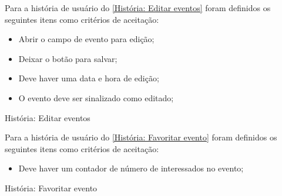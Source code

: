 Para a história de usuário do \autoref{História: Editar eventos} foram definidos os seguintes itens como critérios de aceitação:

\begin{itemize}
\item Abrir o campo de evento para edição;
\item Deixar o botão para salvar;
\item Deve haver uma data e hora de edição;
\item O evento deve ser sinalizado como editado;
\end{itemize}

\def\arraystretch{2}
\begin{quadro}[htb]
\centering
\ABNTEXfontereduzida
\caption[História: Editar eventos]{História: Editar eventos}
\label{História: Editar eventos}
\end{quadro}
\FloatBarrier 


Para a história de usuário do \autoref{História: Favoritar evento} foram definidos os seguintes itens como critérios de aceitação:

\begin{itemize}
\item  Deve haver um contador de número de interessados no evento;
\end{itemize}

\def\arraystretch{2}
\begin{quadro}[htb]
\centering
\ABNTEXfontereduzida
\caption[História: Favoritar evento]{História: Favoritar evento}
\label{História: Favoritar evento}
\end{quadro}
\FloatBarrier 

